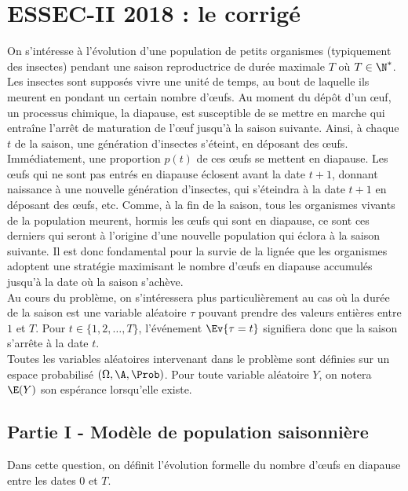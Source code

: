 \chapter*{ESSEC-II 2018 : le corrigé}
  
%

\noindent
On s'intéresse à l'évolution d'une population de petits organismes 
(typiquement des insectes) pendant une \og saison \fg{} reproductrice 
de durée maximale $T$ où $T \in \N^*$. Les insectes sont supposés vivre 
une unité de temps, au bout de laquelle ils meurent en pondant un 
certain nombre d'{\oe}ufs. Au moment du dépôt d'un {\oe}uf, un 
processus chimique, la diapause, est susceptible de se mettre en marche 
qui entraîne l'arrêt de maturation de l'{\oe}uf jusqu'à la saison 
suivante. Ainsi, à chaque $t$ de la saison, une génération d'insectes 
s'éteint, en déposant des {\oe}ufs. Immédiatement, une proportion 
$p(t)$ de ces {\oe}ufs se mettent en diapause. Les {\oe}ufs qui ne sont 
pas entrés en diapause éclosent avant la date $t+1$, donnant naissance 
à une nouvelle génération d'insectes, qui s'éteindra à la date $t+1$ en 
déposant des {\oe}ufs, etc. Comme, à la fin de la saison, tous les 
organismes vivants de la population meurent, hormis les {\oe}ufs qui 
sont en diapause, ce sont ces derniers qui seront à l'origine d'une 
nouvelle population qui éclora à la saison suivante. Il est donc 
fondamental pour la survie de la lignée que les organismes adoptent une 
stratégie maximisant le nombre d'{\oe}ufs en diapause accumulés jusqu'à 
la date où la saison s'achève.\\[.1cm]
Au cours du problème, on s'intéressera plus particulièrement au cas où 
la durée de la saison est une variable aléatoire $\tau$ pouvant prendre 
des valeurs entières entre $1$ et $T$. Pour $t\in \{1,2, \ldots, T\}$, 
l'événement $\Ev{\tau=t}$ signifiera donc que la saison s'arrête à la 
date $t$.\\[.1cm]
Toutes les variables aléatoires intervenant dans le problème sont 
définies sur un espace probabilisé $(\Omega, \A, \Prob)$. Pour toute 
variable aléatoire $Y$, on notera $\E(Y)$ son espérance lorsqu'elle 
existe.



\section*{Partie I - Modèle de population saisonnière}

\noindent
\begin{minipage}{20cm}
  Dans cette question, on définit l'évolution formelle du nombre 
  d'{\oe}ufs en diapause entre les dates $0$ et $T$.
\end{minipage}

